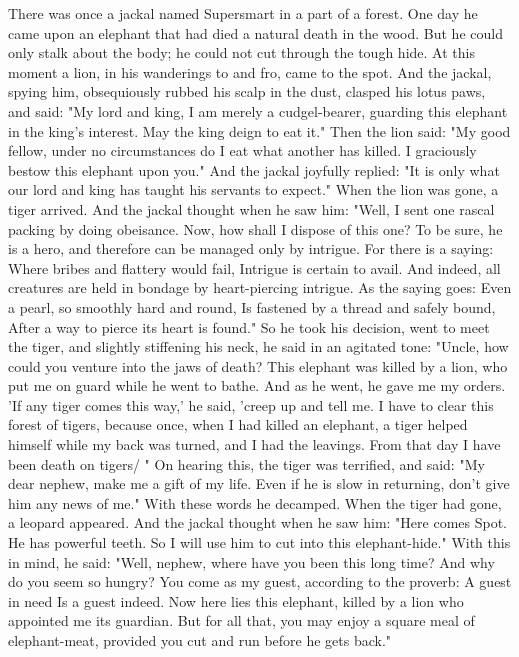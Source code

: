 \documentclass{book}
\begin{document}
There was once a jackal named Supersmart in a
part of a forest. One day he came upon an elephant
that had died a natural death in the wood. But he
could only stalk about the body; he could not cut
through the tough hide.
At this moment a lion, in his wanderings to and
fro, came to the spot. And the jackal, spying him,
obsequiously rubbed his scalp in the dust, clasped his
lotus paws, and said: "My lord and king, I am
merely a cudgel-bearer, guarding this elephant in
the king's interest. May the king deign to eat it."
Then the lion said: "My good fellow, under no
circumstances do I eat what another has killed. I
graciously bestow this elephant upon you." And the
jackal joyfully replied: "It is only what our lord and
king has taught his servants to expect."
When the lion was gone, a tiger arrived. And the
jackal thought when he saw him: "Well, I sent one
rascal packing by doing obeisance. Now, how shall
I dispose of this one? To be sure, he is a hero, and
therefore can be managed only by intrigue. For
there is a saying:
Where bribes and flattery would fail,
Intrigue is certain to avail.
And indeed, all creatures are held in bondage by
heart-piercing intrigue. As the saying goes:
Even a pearl, so smoothly hard and round,
Is fastened by a thread and safely bound,
After a way to pierce its heart is found."
So he took his decision, went to meet the tiger,
and slightly stiffening his neck, he said in an agitated
tone: "Uncle, how could you venture into the jaws
of death? This elephant was killed by a lion, who put
me on guard while he went to bathe. And as he went,
he gave me my orders. 'If any tiger comes this way,'
he said, 'creep up and tell me. I have to clear this
forest of tigers, because once, when I had killed an
elephant, a tiger helped himself while my back was
turned, and I had the leavings. From that day I have
been death on tigers/ "
On hearing this, the tiger was terrified, and said:
"My dear nephew, make me a gift of my life. Even
if he is slow in returning, don't give him any news
of me." With these words he decamped.
When the tiger had gone, a leopard appeared.
And the jackal thought when he saw him: "Here
comes Spot. He has powerful teeth. So I will use him
to cut into this elephant-hide."
With this in mind, he said: "Well, nephew, where
have you been this long time? And why do you seem
so hungry? You come as my guest, according to the
proverb:
A guest in need
Is a guest indeed.
Now here lies this elephant, killed by a lion who
appointed me its guardian. But for all that, you may
enjoy a square meal of elephant-meat, provided you
cut and run before he gets back."
\end{document}
